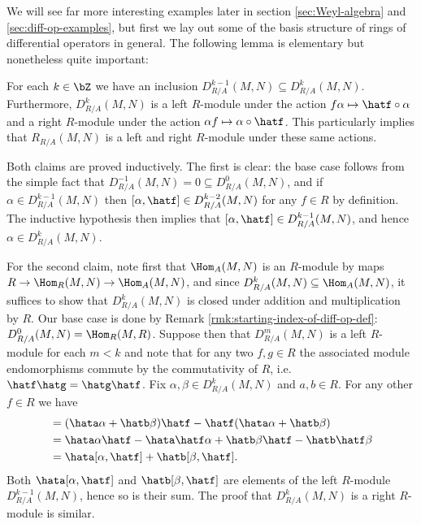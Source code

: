 We will see far more interesting examples later in section \ref{sec:Weyl-algebra} and \ref{sec:diff-op-examples}, but first we lay out some of the basis structure of rings of differential operators in general. The following lemma is elementary but nonetheless quite important:
\begin{lem}\label{lem:fixed-order-ops-form-module}
	For each $k \in \bZ$ we have an inclusion $D^{k-1}_{R/A}(M,N) \subseteq D^k_{R/A}(M,N)$. Furthermore, $D^k_{R/A}(M,N)$ is a left $R$-module under the action $f\alpha \mapsto \hatf\circ \alpha$ and a right $R$-module under the action $\alpha f \mapsto \alpha \circ \hatf$. This particularly implies that $R_{R/A}(M,N)$ is a left and right $R$-module under these same actions.
\end{lem}
\begin{prf}
	Both claims are proved inductively. The first is clear: the base case follows from the simple fact that $D^{-1}_{R/A}(M,N) = 0 \subseteq D^0_{R/A}(M,N)$, and if $\alpha \in D^{k-1}_{R/A}(M,N)$ then $[\alpha,\hatf] \in D^{k-2}_{R/A}(M,N)$ for any $f \in R$ by definition. The inductive hypothesis then implies that $[\alpha,\hatf] \in D^{k-1}_{R/A}(M,N)$, and hence $\alpha \in D^k_{R/A}(M,N)$.

	For the second claim, note first that $\Hom_A(M,N)$ is an $R$-module by maps $R\to \Hom_R(M,N) \to \Hom_A(M,N)$, and since $D^k_{R/A}(M,N)\subseteq \Hom_A(M,N)$, it suffices to show that $D^k_{R/A}(M,N)$ is closed under addition and multiplication by $R$. Our base case is done by Remark \ref{rmk:starting-index-of-diff-op-def}: $D^0_{R/A}(M,N) = \Hom_R(M,R)$. Suppose then that $D^m_{R/A}(M,N)$ is a left $R$-module for each $m < k$ and note that for any two $f,g\in R$ the associated module endomorphisms commute by the commutativity of $R$, i.e. $\hatf\hatg = \hatg\hatf$. Fix $\alpha,\beta \in D^k_{R/A}(M,N)$ and $a,b \in R$. For any other $f \in R$ we have
	\begin{align*}
		[\hata\alpha + \hatb\beta, \hatf] 
		  &= (\hata\alpha + \hatb\beta)\hatf - \hatf(\hata\alpha + \hatb\beta) \\
		  &= \hata\alpha\hatf - \hata\hatf\alpha + \hatb\beta\hatf - \hatb\hatf\beta \\
		  &= \hata[\alpha,\hatf] + \hatb[\beta,\hatf].
	\end{align*}
	Both $\hata[\alpha,\hatf]$ and $\hatb[\beta,\hatf]$ are elements of the left $R$-module $D^{k-1}_{R/A}(M,N)$, hence so is their sum. The proof that $D^k_{R/A}(M,N)$ is a right $R$-module is similar.
\end{prf}

